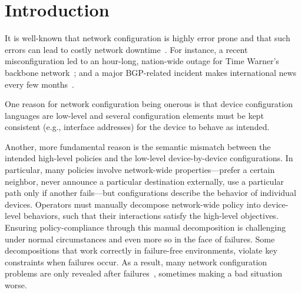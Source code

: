 \section{Introduction}
\label{sec:introduction}

It is well-known that network configuration is highly error
prone and that such errors can lead to costly network
downtime~\cite{mahajan+:bgp-misconfiguration,feamster+:rcc,batfish}.
For instance, a recent misconfiguration led to an hour-long, nation-wide outage for Time Warner's backbone network~\cite{time-warner}; and a major BGP-related incident makes international news every few months~\cite{bgpmon}.


One reason for network configuration being onerous is that device configuration languages are low-level and several configuration elements must be kept consistent (e.g., interface addresses) for the device to behave as intended.

Another, more fundamental reason is the semantic mismatch between the intended high-level
policies and the low-level device-by-device configurations.  In particular,
many policies involve network-wide properties---prefer a certain neighbor,
never announce a particular destination externally,
use a particular path only if another fails---but configurations describe the behavior of
individual devices.
%
Operators must manually decompose network-wide policy into device-level behaviors, such that their interactions satisfy the high-level objectives.
%
Ensuring policy-compliance through this manual decomposition is challenging under normal
circumstances and even more so in the face of failures. Some decompositions that work correctly
in failure-free environments, violate key constraints when failures occur.
%
As a result, many network configuration problems are only revealed after failures~\cite{batfish},
sometimes making a bad situation worse.

